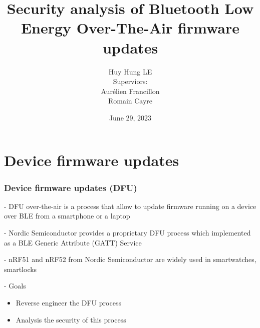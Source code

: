\documentclass[34pt]{beamer}
\title[Semester project]{Security analysis of Bluetooth Low Energy Over-The-Air firmware updates}
\author[Huy Hung LE]{Huy Hung LE\\[0.5cm]{\small Superviors:}\\ Aur\'elien Francillon\\Romain Cayre}
\institute{Eurecom}
\date{June 29, 2023}
\begin{document}
	
	\begin{frame}
		\titlepage
	\end{frame}
	
	
	\begin{frame}
		\tableofcontents
	\end{frame}
	
	
	\section{Device firmware updates}

	
	\begin{frame}
		\frametitle{Device firmware updates (DFU)}
		
		- DFU over-the-air is a process that allow to update firmware running on a device over BLE from a smartphone or a laptop
		
		\vspace{0.5cm}
		- Nordic Semiconductor provides a proprietary DFU process which implemented as a BLE Generic Attribute (GATT) Service
		
		\vspace{0.5cm}
		- nRF51 and nRF52 from Nordic Semiconductor are widely used in smartwatches, smartlocks
	
	\vspace{0.5cm}
		\pause- Goals
		\begin{itemize}
			\item Reverse engineer the DFU process
			\item Analysis the security of this process
		\end{itemize}
	\end{frame}

\end{document}
